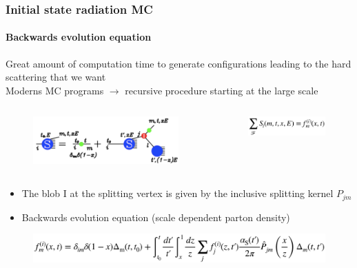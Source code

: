 \documentclass[aspectratio=43]{beamer}
\begin{document}
\begin{frame}

	\frametitle{Initial state radiation MC}
	\framesubtitle{Backwards evolution equation}

	\footnotesize Great amount of computation time to generate configurations leading to the hard scattering that we want \\
	\footnotesize Moderns MC programs $\rightarrow$ recursive procedure starting at the large scale \\
	
	\begin{columns}
		
		
		\begin{figure}
			\includegraphics[width = 6 cm]{plots/ISR_backwards.png}
		\end{figure}
		
		
		\begin{figure}
			\includegraphics[width = 3.5 cm]{plots/ISR_backwards_eq1.png}
		\end{figure}
		
	\end{columns}
	
	\vspace{0.5cm}
	
	\begin{itemize}
		\item \footnotesize The {\color{red}blob I} at the splitting vertex is given by the inclusive splitting kernel $P_{jm}$ \\
		\item \footnotesize Backwards evolution equation (scale dependent parton density)
	\end{itemize}

	\begin{figure}
		\includegraphics[width = 10 cm]{plots/ISR_backwards_eq2.png}
	\end{figure}

\end{frame}
\end{document}
